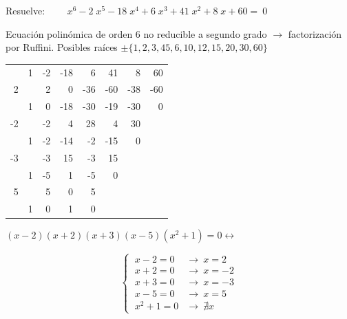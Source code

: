 \begin{miejemplo}

Resuelve: $\qquad x^{6} - 2 \; x^{5} - 18 \; x^{4} + 6 \; x^{3} + 41 \; x^{2} + 8 \; x + 60 = \ 0$	

\vspace{5mm} Ecuación polinómica de orden 6 no reducible a segundo grado $\to$ factorización por Ruffini. Posibles raíces $\pm\{1,2,3,45,6,10,12,15,20,30,60\}$

\begin{multicols}{2}
\begin{table}[H]
\centering
\begin{tabular}{r|rrrrrrr}
 & 1 & -2 & -18 & 6 & 41 & 8 & 60 \\
2 &  & 2 & 0 & -36 & -60 & -38 & -60 \\ \hline
 & 1 & 0 & -18 & -30 & -19 & \multicolumn{1}{r|}{-30} & 0 \\ \cline{8-8} 
-2 &  & -2 & 4 & 28 & 4 & 30 &  \\ \cline{1-7}
 & 1 & -2 & -14 & -2 & \multicolumn{1}{r|}{-15} & 0 &  \\ \cline{7-7}
-3 &  & -3 & 15 & -3 & 15 &  &  \\ \cline{1-6}
 & 1 & -5 & 1 & \multicolumn{1}{r|}{-5} & 0 &  &  \\ \cline{6-6}
5 &  & 5 & 0 & 5 &  &  &  \\ \cline{1-5}
 & 1 & 0 & \multicolumn{1}{r|}{1} & 0 &  &  &  \\ \cline{5-5}
\end{tabular}
\end{table}	

$(x-2)(x+2)(x+3)(x-5)(x^2+1)=0 \leftrightarrow $


$$\begin{cases}
 \ x-2=0 &\to \ x=2 \\	
 \ x+2=0 &\to \ x=-2 \\
 \ x+3=0 &\to \ x=-3 \\
 \ x-5=0 &\to \ x=5 \\
 \ x^2+1=0 &\to \ \nexists x
 \end{cases}$$

\end{multicols}

\end{miejemplo}



